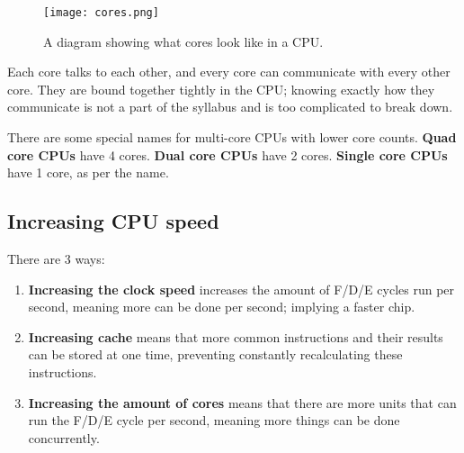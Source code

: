 \documentclass[../main.tex]{subfiles}
\begin{document}
\begin{figure}[H]
    \centering
    \texttt{[image: cores.png]}
    \caption{A diagram showing what cores look like in a CPU.}
    \label{fig:cores}
\end{figure}

Each core talks to each other, and every core can communicate with every other core. They are bound together tightly in the CPU; knowing exactly how they communicate is not a part of the syllabus and is too complicated to break down.

There are some special names for multi-core CPUs with lower core counts. \textbf{Quad core CPUs} have 4 cores. \textbf{Dual core CPUs} have 2 cores. \textbf{Single core CPUs} have 1 core, as per the name.

\subsection{Increasing CPU speed}

There are 3 ways:

\begin{enumerate}
    \item \textbf{Increasing the clock speed} increases the amount of F/D/E cycles run per second, meaning more can be done per second; implying a faster chip.
    \item \textbf{Increasing cache} means that more common instructions and their results can be stored at one time, preventing constantly recalculating these instructions.
    \item \textbf{Increasing the amount of cores} means that there are more units that can run the F/D/E cycle per second, meaning more things can be done concurrently.
\end{enumerate}
\end{document}
